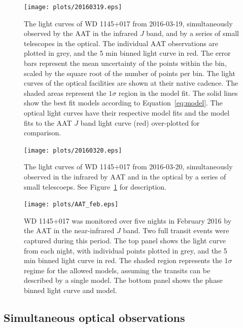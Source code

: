 \documentclass[apj]{emulateapj}
\begin{document}
\begin{figure}
    \vspace{5mm}
    \centering
    \texttt{[image: plots/20160319.eps]}
    \caption{The light curves of WD 1145+017 from 2016-03-19, simultaneously observed by the AAT in the infrared $J$ band, and by a series of small telescopes in the optical. The individual AAT observations are plotted in grey, and the 5 min binned light curve in red. The error bars represent the mean uncertainty of the points within the bin, scaled by the square root of the number of points per bin. The light curves of the optical facilities are shown at their native cadence. The shaded areas represent the $1\sigma$ region in the model fit. The solid lines show the best fit models according to Equation~\ref{eq:model}. The optical light curves have their respective model fits and the model fits to the AAT $J$ band light curve (red) over-plotted for comparison.}
    \label{fig:lc_20160319}
\end{figure}

\begin{figure}
    \vspace{5mm}

    \centering
    \texttt{[image: plots/20160320.eps]}
    \caption{The light curves of WD 1145+017 from 2016-03-20, simultaneously observed in the infrared by AAT and in the optical by a series of small telescoeps. See Figure~\ref{fig:lc_20160319} for description.}
    \label{fig:lc_20160320}
\end{figure}


\begin{figure}
    \vspace{5mm}
    \centering
    \texttt{[image: plots/AAT\_feb.eps]}
    \caption{WD 1145+017 was monitored over five nights in February 2016 by the AAT in the near-infrared $J$ band. Two full transit events were captured during this period. The top panel shows the light curve from each night, with individual points plotted in grey, and the 5 min binned light curve in red. The shaded region represents the $1\sigma$ regime for the allowed models, assuming the transits can be described by a single model. The bottom panel shows the phase binned light curve and model.}
    \label{fig:lc_201602}
\end{figure}


\subsection{Simultaneous optical observations}
\label{sec:simultaneous-optical}
\end{document}
